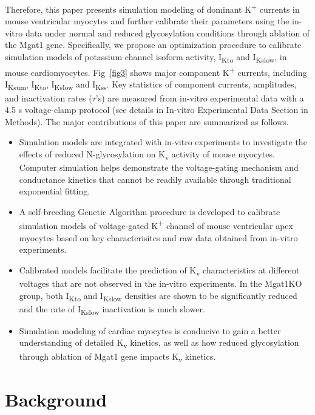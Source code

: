 \documentclass[10pt,letterpaper]{article}
\begin{document}
Therefore, this paper presents simulation modeling of dominant K\textsuperscript{+} currents in mouse ventricular myocytes and further calibrate their parameters using the in-vitro data under normal and reduced glycosylation conditions through ablation of the Mgat1 gene. Specifically, we propose an optimization procedure to calibrate simulation models of potassium channel isoform activity, I\textsubscript{Kto} and I\textsubscript{Kslow}, in mouse cardiomyocytes.  Fig~\ref{fig3} shows  major component K\textsuperscript{+} currents, including I\textsubscript{Ksum}, I\textsubscript{Kto}, I\textsubscript{Kslow} and I\textsubscript{Kss}. Key statistics of component currents, amplitudes, and inactivation rates ($\tau$'s) are measured from in-vitro experimental data with a 4.5 s voltage-clamp protocol (see details in In-vitro Experimental Data Section in Methods). The major contributions of this paper are summarized as follows.
\begin{itemize}
    \item Simulation models are integrated with in-vitro experiments to investigate the effects of reduced N-glycosylation on K\textsubscript{v} activity of mouse myocytes. Computer simulation helps demonstrate the voltage-gating mechanism and conductance kinetics that cannot be readily available through traditional exponential fitting. 
    \item A self-breeding Genetic Algorithm procedure is developed to calibrate simulation models of voltage-gated K\textsuperscript{+} channel of mouse ventricular apex myocytes based on key characterisitcs and raw data obtained from in-vitro experiments.
    \item Calibrated models facilitate the prediction of K\textsubscript{v} characteristics at different voltages that are not observed in the in-vitro experiments. In the Mgat1KO group, both I\textsubscript{Kto} and I\textsubscript{Kslow} densities are shown to be significantly reduced and the rate of I\textsubscript{Kslow} inactivation is much slower.
    \item Simulation modeling of cardiac myocytes is conducive to gain a better understanding of detailed K\textsubscript{v} kinetics, as well as how reduced glycosylation through ablation of Mgat1 gene impacts K\textsubscript{v} kinetics.
\end{itemize}

\section*{Background}
\end{document}
